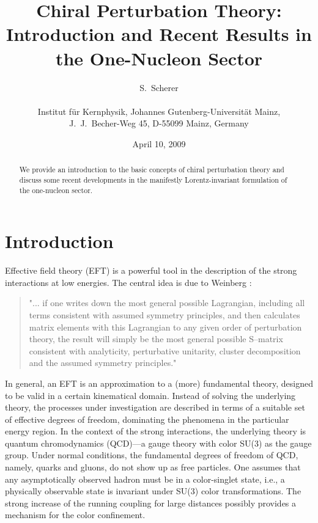 \documentclass[twoside,12pt]{article}
\begin{document}
\title{ \vspace{1cm} Chiral Perturbation Theory: Introduction and Recent Results
in the One-Nucleon Sector}
\author{S.\ Scherer\\ \\
Institut f\"ur Kernphysik, Johannes Gutenberg-Universit\"at Mainz,\\
J.~J.~Becher-Weg 45, D-55099 Mainz, Germany}
\date{April 10, 2009}
\maketitle

\begin{abstract}
   We provide an introduction to the basic concepts of chiral perturbation
theory and discuss some recent developments in the manifestly Lorentz-invariant
formulation of the one-nucleon sector.
\end{abstract}
\tableofcontents
\section{Introduction}
   Effective field theory (EFT) is a powerful tool in the description of the
strong interactions at low energies.
   The central idea is due to Weinberg \cite{Weinberg:1978kz}:
   \begin{quote}
"...  if one writes down the most general possible Lagrangian,
including all terms consistent with assumed symmetry principles, and
then calculates matrix elements with this Lagrangian to any given
order of perturbation theory, the result will simply be the most
general possible S--matrix consistent with analyticity, perturbative
unitarity, cluster decomposition and the assumed symmetry
principles."
\end{quote}
   In general, an EFT is an approximation to a (more) fundamental theory, designed
to be valid in a certain kinematical domain.
   Instead of solving the underlying theory, the processes under investigation
are described in terms of a suitable set of effective degrees of freedom, dominating
the phenomena in the particular energy region.
   In the context of the strong interactions, the underlying theory is
quantum chromodynamics
(QCD)---a gauge theory with color SU(3) as the gauge group.
   Under normal conditions, the fundamental degrees of freedom of QCD,
namely, quarks and gluons, do not show up as free particles.
   One assumes that any asymptotically observed hadron must be in a
color-singlet state, i.e., a physically observable state is invariant under
SU(3) color transformations.
   The strong increase of the running coupling for large distances possibly
provides a mechanism for the color confinement.
\end{document}
